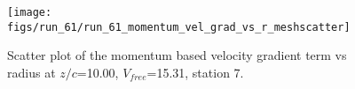 \begin{figure}[H]
\centering
\texttt{[image: figs/run\_61/run\_61\_momentum\_vel\_grad\_vs\_r\_meshscatter]}
\caption{Scatter plot of the momentum based velocity gradient term vs radius at $z/c$=10.00, $V_{free}$=15.31, station 7.}
\label{fig:run_61_momentum_vel_grad_vs_r_meshscatter}
\end{figure}



